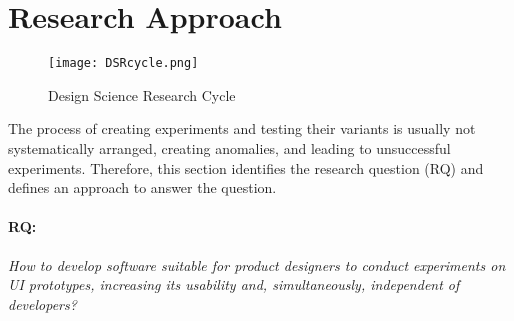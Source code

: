 \section{Research Approach}  %
\label{introduction:section:research}

\begin{figure}[ht]
    \centering
    \texttt{[image: DSRcycle.png]}
    \caption[Design Science Research Cycle]{Design Science Research Cycle \cite{paper:designprinciple:vk}}
    \label{intro:fig:dps}
\end{figure}
The process of creating experiments and testing their variants is usually not systematically arranged, creating anomalies, and leading to unsuccessful experiments.
Therefore, this section identifies the research question (RQ) and defines an approach to answer the question.

\paragraph{RQ:} \textit{How to develop software suitable for product designers to conduct experiments on UI prototypes, increasing its usability and, simultaneously, independent of developers?}\\

